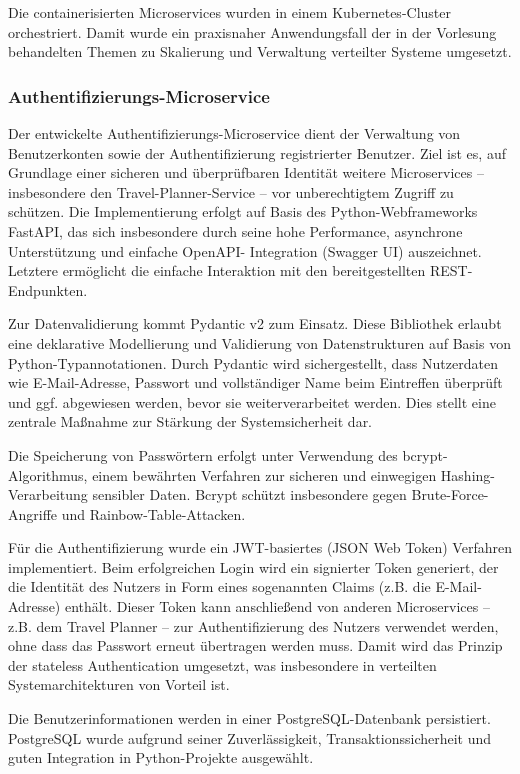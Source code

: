 Die containerisierten Microservices wurden in einem Kubernetes-Cluster orchestriert. Damit wurde ein praxisnaher Anwendungsfall der in der Vorlesung behandelten Themen zu Skalierung und Verwaltung verteilter Systeme umgesetzt.

\subsubsection{Authentifizierungs-Microservice}

Der entwickelte Authentifizierungs-Microservice dient der Verwaltung von Benutzerkonten sowie der Authentifizierung registrierter Benutzer. Ziel ist es, auf Grundlage einer sicheren und überprüfbaren Identität weitere Microservices – insbesondere den Travel-Planner-Service – vor unberechtigtem Zugriff zu schützen. Die Implementierung erfolgt auf Basis des Python-Webframeworks FastAPI, das sich insbesondere durch seine hohe Performance, asynchrone Unterstützung und einfache OpenAPI- Integration (Swagger UI) auszeichnet. Letztere ermöglicht die einfache Interaktion mit den bereitgestellten REST-Endpunkten.

Zur Datenvalidierung kommt Pydantic v2 zum Einsatz. Diese Bibliothek erlaubt eine deklarative Modellierung und Validierung von Datenstrukturen auf Basis von Python-Typannotationen. Durch Pydantic wird sichergestellt, dass Nutzerdaten wie E-Mail-Adresse, Passwort und vollständiger Name beim Eintreffen überprüft und ggf. abgewiesen werden, bevor sie weiterverarbeitet werden. Dies stellt eine zentrale Maßnahme zur Stärkung der Systemsicherheit dar.

Die Speicherung von Passwörtern erfolgt unter Verwendung des bcrypt-Algorithmus, einem bewährten Verfahren zur sicheren und einwegigen Hashing-Verarbeitung sensibler Daten. Bcrypt schützt insbesondere gegen Brute-Force-Angriffe und Rainbow-Table-Attacken.

Für die Authentifizierung wurde ein JWT-basiertes (JSON Web Token) Verfahren implementiert. Beim erfolgreichen Login wird ein signierter Token generiert, der die Identität des Nutzers in Form eines sogenannten Claims (z.B. die E-Mail-Adresse) enthält. Dieser Token kann anschließend von anderen Microservices – z.B. dem Travel Planner – zur Authentifizierung des Nutzers verwendet werden, ohne dass das Passwort erneut übertragen werden muss. Damit wird das Prinzip der stateless Authentication umgesetzt, was insbesondere in verteilten Systemarchitekturen von Vorteil ist.

Die Benutzerinformationen werden in einer PostgreSQL-Datenbank persistiert. PostgreSQL wurde aufgrund seiner Zuverlässigkeit, Transaktionssicherheit und guten Integration in Python-Projekte ausgewählt.

